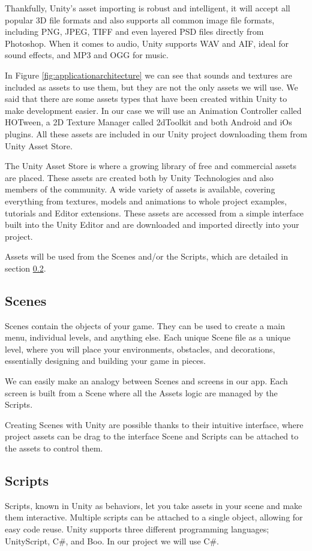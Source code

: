 Thankfully, Unity’s asset importing is robust and intelligent, it will accept all popular 3D file formats and also supports all common image file formats, including PNG, JPEG, TIFF and even layered PSD files directly from Photoshop. When it comes to audio, Unity supports WAV and AIF, ideal for sound effects, and MP3 and OGG for music.

In Figure \ref{fig:applicationarchitecture} we can see that sounds and textures are included as assets to use them, but they are not the only assets we will use. We said that there are some assets types that have been created within Unity to make development easier. In our case we will use an Animation Controller called HOTween, a 2D Texture Manager called 2dToolkit and both Android and iOs plugins. All these assets are included in our Unity project downloading them from Unity Asset Store.

The Unity Asset Store is where a growing library of free and commercial assets are placed. These assets are created both by Unity Technologies and also members of the community. A wide variety of assets is available, covering everything from textures, models and animations to whole project examples, tutorials and Editor extensions. These assets are accessed from a simple interface built into the Unity Editor and are downloaded and imported directly into your project.

Assets will be used from the Scenes and/or the Scripts, which are detailed in section \ref{subsec:unityscripts}.

\subsection{Scenes}
Scenes contain the objects of your game. They can be used to create a main menu, individual levels, and anything else. Each unique Scene file as a unique level, where you will place your environments, obstacles, and decorations, essentially designing and building your game in pieces.

We can easily make an analogy between Scenes and screens in our app. Each screen is built from a Scene where all the Assets logic are managed by the Scripts.

Creating Scenes with Unity are possible thanks to their intuitive interface, where project assets can be drag to the interface Scene and Scripts can be attached to the assets to control them.

\subsection{Scripts}
\label{subsec:unityscripts}
Scripts, known in Unity as behaviors, let you take assets in your scene and make them interactive. Multiple scripts can be attached to a single object, allowing for easy code reuse. Unity supports three different programming languages; UnityScript, C\#, and Boo. In our project we will use C\#.

